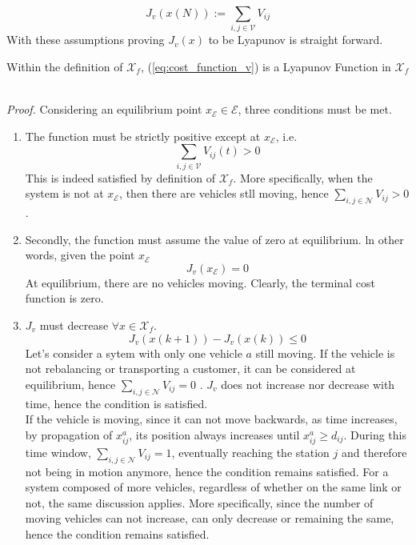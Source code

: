 \begin{equation}
	 J_v(x(N)):= \sum_{i,j \in \mathcal{V}}V_{ij}\label{eq:cost_function_v}
\end{equation}
With these assumptions proving $J_v(x)$ to be Lyapunov is straight forward. \\

\begin{proposition}{}
	Within the definition of $\mathcal{X}_f$, (\ref{eq:cost_function_v}) is a Lyapunov Function in $\mathcal{X}_f$
\end{proposition}\\
\textit{Proof. } Considering an equilibrium point $x_{\mathcal{E}}\in\mathcal{E}$, three conditions must be met.\\
\begin{enumerate}
	\item The function must be strictly positive except at $x_{\mathcal{E}}$, i.e.
	\begin{equation*}
		\sum_{i,j \in \mathcal{V}}V_{ij}(t) >0
	\end{equation*}
	This is indeed satisfied by definition of $\mathcal{X}_f$. More specifically, when the system is not at $x_{\mathcal{E}}$, then there are vehicles stll moving, hence $\sum_{i,j \in \mathcal{N}}V_{ij} >0$. \\
	\item Secondly, the function must assume the value of zero at equilibrium. ln other words, given the point $x_{\mathcal{E}}$
	\begin{equation*}
		J_v(x_{\mathcal{E}}) = 0
	\end{equation*}
	At equilibrium, there are no vehicles moving. Clearly, the terminal cost function is zero. 
	\item $J_v$ must decrease $\forall x \in \mathcal{X}_f$. 
	\begin{equation*}
		J_v(x(k+1)) - J_v(x(k))\leq 0
	\end{equation*}
	Let's consider a sytem with only one vehicle $a$ still moving. If the vehicle is not rebalancing or transporting a customer, it can be considered at equilibrium, hence $\sum_{i,j \in \mathcal{N}}V_{ij} =0$ . $J_v$ does not increase nor decrease with time, hence the condition is satisfied. \\
	If the vehicle is moving, since it can not move backwards, as time increases, by propagation of $x_{ij}^a$, its position always increases until $x_{ij}^a \ge d_{ij}$. During this time window, $\sum_{i,j \in \mathcal{N}}V_{ij} =1$, eventually reaching the station $j$ and therefore not being in motion anymore, hence the condition remains satisfied. For a system composed of more vehicles, regardless of whether on the same link or not, the same discussion applies. More specifically, since the number of moving vehicles can not increase, can only decrease or remaining the same, hence the condition remains satisfied.
\end{enumerate}




